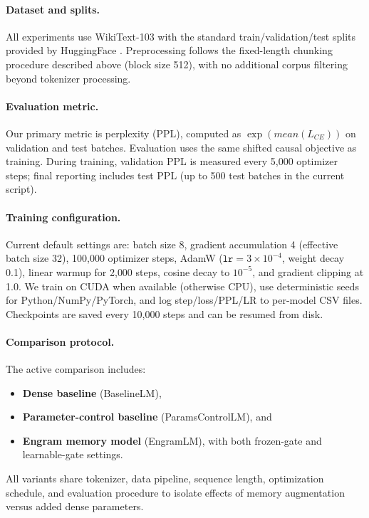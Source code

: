 \documentclass[11pt]{article}
\begin{document}
\paragraph{Dataset and splits.}
All experiments use WikiText-103 with the standard train/validation/test splits provided by HuggingFace \cite{merity2016pointer}.
Preprocessing follows the fixed-length chunking procedure described above (block size 512), with no additional corpus filtering beyond tokenizer processing.

\paragraph{Evaluation metric.}
Our primary metric is perplexity (PPL), computed as $\exp(mean(L_{CE}))$ on validation and test batches.
Evaluation uses the same shifted causal objective as training.
During training, validation PPL is measured every 5{,}000 optimizer steps; final reporting includes test PPL (up to 500 test batches in the current script).

\paragraph{Training configuration.}
Current default settings are: batch size 8, gradient accumulation 4 (effective batch size 32), 100{,}000 optimizer steps, AdamW ($\texttt{lr}=3\times10^{-4}$, weight decay 0.1), linear warmup for 2{,}000 steps, cosine decay to $10^{-5}$, and gradient clipping at 1.0.
We train on CUDA when available (otherwise CPU), use deterministic seeds for Python/NumPy/PyTorch, and log step/loss/PPL/LR to per-model CSV files.
Checkpoints are saved every 10{,}000 steps and can be resumed from disk.

\paragraph{Comparison protocol.}
The active comparison includes:
\begin{itemize}
	\item \textbf{Dense baseline} (BaselineLM),
	\item \textbf{Parameter-control baseline} (ParamsControlLM), and
	\item \textbf{Engram memory model} (EngramLM), with both frozen-gate and learnable-gate settings.
\end{itemize}
All variants share tokenizer, data pipeline, sequence length, optimization schedule, and evaluation procedure to isolate effects of memory augmentation versus added dense parameters.
\end{document}
